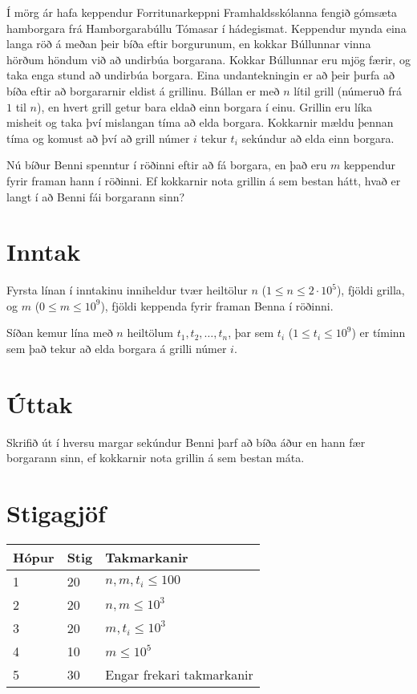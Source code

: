 %
Í mörg ár hafa keppendur Forritunarkeppni Framhaldsskólanna fengið gómsæta
hamborgara frá Hamborgarabúllu Tómasar í hádegismat. Keppendur mynda eina langa
röð á meðan þeir bíða eftir borgurunum, en kokkar Búllunnar vinna hörðum höndum
við að undirbúa borgarana. Kokkar Búllunnar eru mjög færir, og taka enga stund
að undirbúa borgara. Eina undantekningin er að þeir þurfa að bíða eftir að
borgararnir eldist á grillinu. Búllan er með $n$ lítil grill (númeruð frá $1$ til
$n$), en hvert grill getur bara eldað einn borgara í einu. Grillin eru líka
misheit og taka því mislangan tíma að elda borgara. Kokkarnir mældu þennan tíma
og komust að því að grill númer $i$ tekur $t_i$ sekúndur að elda einn borgara.

Nú bíður Benni spenntur í röðinni eftir að fá borgara, en það eru $m$ keppendur
fyrir framan hann í röðinni. Ef kokkarnir nota grillin á sem bestan hátt, hvað
er langt í að Benni fái borgarann sinn?

\section*{Inntak}
Fyrsta línan í inntakinu inniheldur tvær heiltölur $n$ ($1 \leq n \leq
2\cdot10^5$), fjöldi grilla, og $m$ ($0 \leq m \leq 10^9$), fjöldi keppenda
fyrir framan Benna í röðinni.

Síðan kemur lína með $n$ heiltölum $t_1, t_2, \ldots, t_n$, þar sem $t_i$ ($1
\leq t_i \leq 10^9$) er tíminn sem það tekur að elda borgara á grilli númer
$i$.

\section*{Úttak}
Skrifið út í hversu margar sekúndur Benni þarf að bíða áður en hann fær borgarann
sinn, ef kokkarnir nota grillin á sem bestan máta.

\section*{Stigagjöf}
\begin{tabular}{|l|l|l|}
\hline
Hópur & Stig & Takmarkanir \\ \hline
1     & 20   & $n, m, t_i \leq 100$ \\ \hline
2     & 20   & $n, m \leq 10^3$ \\ \hline
3     & 20   & $m, t_i \leq 10^3$ \\ \hline
4     & 10   & $m \leq 10^5$ \\ \hline
5     & 30   & Engar frekari takmarkanir\\ \hline
\end{tabular}

